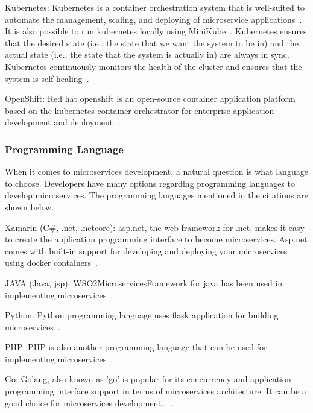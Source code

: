 \par Kubernetes: Kubernetes is a container orchestration system that is well-suited to automate the management, scaling, and deploying of microservice applications~\cite{Zaytev2018, Kristiani2020, khan2020}. 
It is also possible to run kubernetes locally using MiniKube~\cite{leo2019, Kalske2017}.
Kubernetes ensures that the desired state (i.e., the state that we want the system to be in) and the actual state (i.e., the state that the system is actually in) are always in sync. Kubernetes continuously monitors the health of the cluster and ensures that the system is self-healing~\cite{Bahadori2018, Falatiuk2019, Venugopal2017}.

\par OpenShift: Red hat openshift is an open-source container application platform based on the kubernetes container orchestrator for enterprise application development and deployment~\cite{Johansson2019, Bahadori2018}.


\subsubsection{Programming Language}
When it comes to microservices development, a natural question is what language to choose. Developers have many options regarding programming languages to develop microservices. The programming languages mentioned in the citations are shown below.

\par Xamarin (C\#, .net, .netcore): asp.net, the web framework for .net, makes it easy to create the application programming interface to become microservices. Asp.net comes with built-in support for developing and deploying your microservices using docker containers~\cite{liu2018, chauvel2018, haugeland2020, Johansson2019, neves2019, Falatiuk2019}.

\par JAVA (Java, jsp): WSO2MicroservicesFramework for java has been used in implementing microservices~\cite{Sharaf2019, khan2020, KalskeM2017, Venugopal2017}.

\par Python: Python programming language uses flask application for building microservices~\cite{Ghebremicael2017, khan2020, Hou2020}.

\par PHP: PHP is also another programming language that can be used for implementing microservices~\cite{McElhiney2018}.

\par Go: Golang, also known as 'go' is popular for its concurrency and application programming interface support in terms of microservices architecture. It can be a good choice for microservices development. ~\cite{liu2018}.

